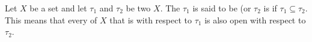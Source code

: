 \begin{definition} \label{definition:coarser_finer_topologies_on_a_set}
Let $X$ be a set and let $\tau_1$ and $\tau_2$ be two  $X$. 
The  $\tau_1$ is said to be  (or $\tau_2$ is  if $\tau_1 \subseteq \tau_2$. This means that every  of $X$ that is  with respect to $\tau_1$ is also open with respect to $\tau_2$.
\end{definition}